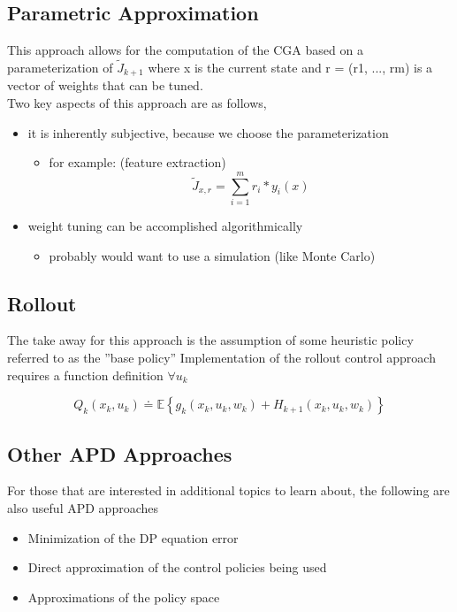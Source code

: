 \documentclass[twoside]{article}
\begin{document}
\subsection{Parametric Approximation}
This approach allows for the computation of the CGA based on a parameterization of $\tilde{J}_{k+1}$ where x is the current state and r = (r1, ..., rm) is a vector of weights that can be tuned.\\
Two key aspects of this approach are as follows,
\begin{itemize}
    \item it is inherently subjective, because we choose the parameterization
    
    \begin{itemize}
        \item for example: (feature extraction)\\
$$ 
\tilde{J}_{x, r}=\sum_{i=1}^{m} r_{i} * y_{i}(x)
 $$
    \end{itemize}
    \item weight tuning can be accomplished algorithmically
    \begin{itemize}
        \item probably would want to use a simulation (like Monte Carlo)
    \end{itemize}
\end{itemize}

\subsection{Rollout}
The take away for this approach is the assumption of some heuristic policy referred to as the ”base policy” Implementation of the rollout control approach requires a function definition $\forall u_k$


$$ 
Q_{k}\left(x_{k}, u_{k}\right) \doteq \mathbb{E}\left\{g_{k}\left(x_{k}, u_{k}, w_{k}\right)+H_{k+1}\left(x_{k}, u_{k}, w_{k}\right)\right\}
 $$

\subsection{Other APD Approaches}
For those that are interested in additional topics to learn about, the following are also useful APD approaches
\begin{itemize}
    \item Minimization of the DP equation error
    \item Direct approximation of the control policies being used
    \item Approximations of the policy space
\end{itemize}
\end{document}
